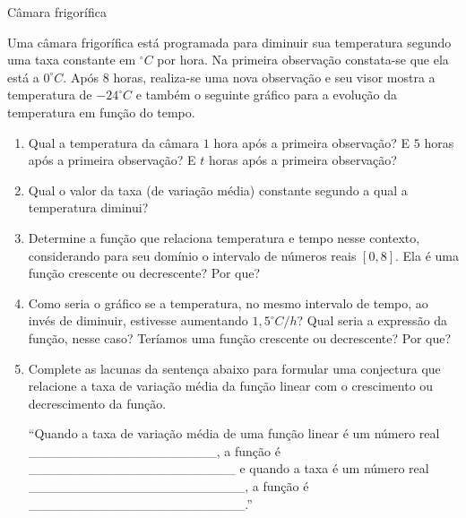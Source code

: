 \begin{task}{Câmara frigorífica}
\label{ativ-camara}

Uma câmara frigorífica está programada para diminuir sua temperatura segundo uma taxa constante em \(^\circ C\) por hora. Na primeira observação constata-se que ela está a \(0^\circ C\). Após \(8\) horas, realiza-se uma nova observação e seu visor mostra a temperatura de \(-24^\circ C\) e também o seguinte gráfico para a evolução da temperatura em função do tempo.
\begin{center}\end{center}\begin{enumerate}
\item {} 
Qual a temperatura da câmara \(1\) hora após a primeira observação? E \(5\) horas após a primeira observação? E \(t\) horas após a primeira observação?

\item {} 
Qual o valor da taxa (de variação média) constante segundo a qual a temperatura diminui?

\item {} 
Determine a função que relaciona temperatura e tempo nesse contexto, considerando para seu domínio o intervalo de números reais \([0,8]\). Ela é uma função crescente ou decrescente? Por que?

\item {} 
Como seria o gráfico se a temperatura, no mesmo intervalo de tempo, ao invés de diminuir, estivesse aumentando \(1,5^\circ C/h\)? Qual seria a expressão da função, nesse caso? Teríamos uma função crescente ou decrescente? Por que?

\item {} 
Complete as lacunas da sentença abaixo para formular uma conjectura que relacione a taxa de variação média da função linear com o crescimento ou decrescimento da função.

“Quando a taxa de variação média de uma função linear é um número real \_\_\_\_\_\_\_\_\_\_\_\_\_\_\_\_\_\_\_\_, a função é \_\_\_\_\_\_\_\_\_\_\_\_\_\_\_\_\_\_\_\_\_\_ e quando a taxa é um número real \_\_\_\_\_\_\_\_\_\_\_\_\_\_\_\_\_\_\_\_\_\_\_, a função é \_\_\_\_\_\_\_\_\_\_\_\_\_\_\_\_\_\_\_\_\_\_\_.”

\end{enumerate}
\end{task}


